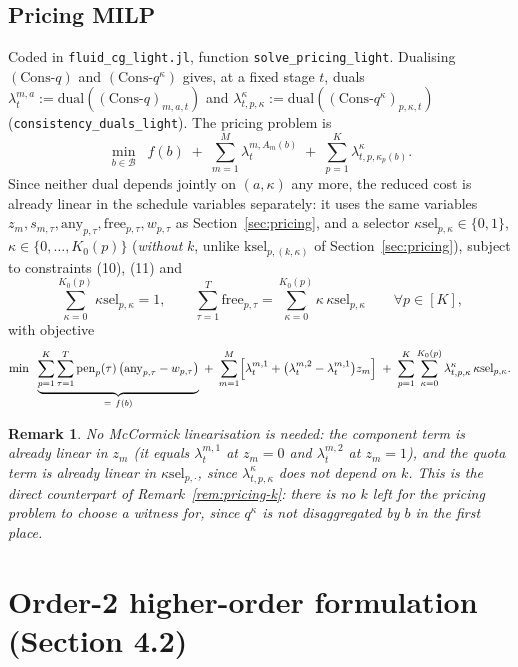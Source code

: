 \documentclass[11pt]{article}
\newtheorem{remark}{Remark}
\newcommand{\any}{\mathrm{any}}
\newcommand{\free}{\mathrm{free}}
\newcommand{\ksel}{\mathrm{ksel}}
\begin{document}
\subsection*{Pricing MILP}

Coded in \texttt{fluid\_cg\_light.jl}, function \texttt{solve\_pricing\_light}. Dualising
$(\mathrm{Cons}\text{-}q)$ and $(\mathrm{Cons}\text{-}q^\kappa)$ gives, at a fixed stage $t$,
duals $\lambda_t^{m,a} := \mathrm{dual}((\mathrm{Cons}\text{-}q)_{m,a,t})$ and
$\lambda^{\kappa}_{t,p,\kappa} := \mathrm{dual}((\mathrm{Cons}\text{-}q^\kappa)_{p,\kappa,t})$
(\texttt{consistency\_duals\_light}). The pricing problem is
\[
  \min_{b \in \mathcal B} \;\; f(b) \;+\; \sum_{m=1}^M \lambda_t^{m,A_m(b)}
  \;+\; \sum_{p=1}^K \lambda^{\kappa}_{t,p,\kappa_p(b)}.
\]
Since neither dual depends jointly on $(a,\kappa)$ any more, the reduced cost is already
linear in the schedule variables separately: it uses the same variables
$z_m, s_{m,\tau}, \any_{p,\tau}, \free_{p,\tau}, w_{p,\tau}$ as Section~\ref{sec:pricing}, and
a selector $\kappa\mathrm{sel}_{p,\kappa} \in \{0,1\}$, $\kappa \in \{0,\dots,K_0(p)\}$
(\emph{without} $k$, unlike $\ksel_{p,(k,\kappa)}$ of Section~\ref{sec:pricing}), subject to
constraints (10), (11) and
\[
  \sum_{\kappa=0}^{K_0(p)} \kappa\mathrm{sel}_{p,\kappa} = 1,
  \qquad
  \sum_{\tau=1}^{T} \free_{p,\tau} = \sum_{\kappa=0}^{K_0(p)} \kappa\, \kappa\mathrm{sel}_{p,\kappa}
  \qquad \forall p \in [K],
\]
with objective
\[
  \min\;\; \underbrace{\sum_{p=1}^K \sum_{\tau=1}^T \mathrm{pen}_p(\tau)\,
      \bigl(\any_{p,\tau} - w_{p,\tau}\bigr)}_{=\ f(b)}
  \;+\; \sum_{m=1}^M \Bigl[\lambda_t^{m,1} + \bigl(\lambda_t^{m,2}-\lambda_t^{m,1}\bigr) z_m\Bigr]
  \;+\; \sum_{p=1}^K \sum_{\kappa=0}^{K_0(p)} \lambda^{\kappa}_{t,p,\kappa}\, \kappa\mathrm{sel}_{p,\kappa}.
\]
\begin{remark}
No McCormick linearisation is needed: the component term is already linear in $z_m$ (it
equals $\lambda_t^{m,1}$ at $z_m=0$ and $\lambda_t^{m,2}$ at $z_m=1$), and the quota term is
already linear in $\kappa\mathrm{sel}_{p,\cdot}$, since $\lambda^\kappa_{t,p,\kappa}$ does not
depend on $k$. This is the direct counterpart of Remark~\ref{rem:pricing-k}: there is no $k$
left for the pricing problem to choose a witness for, since $q^\kappa$ is not disaggregated
by $b$ in the first place.
\end{remark}

\section{Order-2 higher-order formulation (Section 4.2)}
\label{sec:order2}
\end{document}
